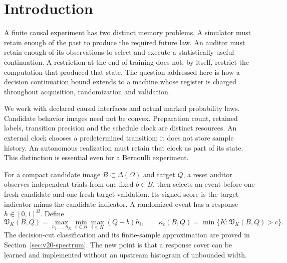 \section{Introduction}
A finite causal experiment has two distinct memory problems. A simulator
must retain enough of the past to produce the required future law. An
auditor must retain enough of its observations to select and execute a
statistically useful continuation. A restriction at the end of training
does not, by itself, restrict the computation that produced that state.
The question addressed here is how a decision continuation bound extends
to a machine whose register is charged throughout acquisition,
randomization and validation.

We work with declared causal interfaces and actual marked probability
laws. Candidate behavior images need not be convex. Preparation count,
retained labels, transition precision and the schedule clock are distinct
resources. An external clock chooses a predetermined transition; it does
not store sample history. An autonomous realization must retain that
clock as part of its state. This distinction is essential even for a
Bernoulli experiment.

For a compact candidate image $B\subset\Delta(\Omega)$ and target $Q$,
a reset auditor observes independent trials from one fixed $b\in B$,
then selects an event before one fresh candidate and one fresh target
validation. Its signed score is the target indicator minus the candidate
indicator. A randomized event has a response $h\in[0,1]^\Omega$. Define
\[
 \mathfrak V_K(B,Q)=\max_{h_1,\ldots,h_K}
                    \min_{b\in B}\max_{i\le K}(Q-b)h_i,
 \qquad
 \kappa_c(B,Q)=\min\{K:\mathfrak V_K(B,Q)>c\}.
\]
The decision-cut classification and its finite-sample approximation are
proved in Section~\ref{sec:v20-spectrum}. The new point is that a
response cover can be learned and implemented without an upstream
histogram of unbounded width.

